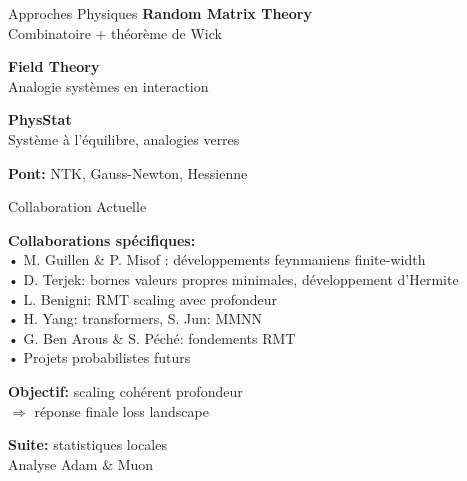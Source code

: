 \documentclass{beamer}
\begin{document}
\begin{frame}{Approches Physiques}
\textbf{Random Matrix Theory}\\
Combinatoire + théorème de Wick

\textbf{Field Theory}\\
Analogie systèmes en interaction

\textbf{PhysStat}\\
Système à l'équilibre, analogies verres

\vspace{0.5cm}

\textbf{Pont:} NTK, Gauss-Newton, Hessienne
\end{frame}

\begin{frame}{Collaboration Actuelle}

\vspace{0.3cm}

\textbf{Collaborations spécifiques:}\\
• M. Guillen \& P. Misof : développements feynmaniens finite-width\\
• D. Terjek: bornes valeurs propres minimales, développement d'Hermite\\
• L. Benigni: RMT scaling avec profondeur\\
• H. Yang: transformers, S. Jun: MMNN\\
• G. Ben Arous \& S. Péché: fondements RMT\\
• Projets probabilistes futurs


\vspace{0.5cm}

\textbf{Objectif:} scaling cohérent profondeur\\
$\Rightarrow$ réponse finale loss landscape

\vspace{0.5cm}

\textbf{Suite:} statistiques locales\\
Analyse Adam \& Muon
\end{frame}
\end{document}

